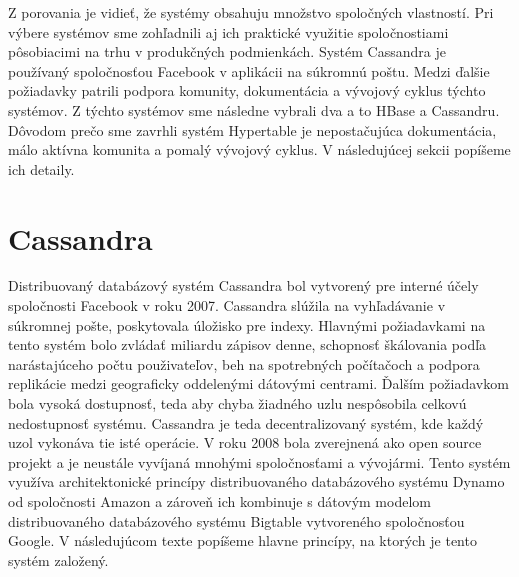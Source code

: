 \documentclass[11pt,twoside,a4paper]{book}
\begin{document}

Z porovania je vidieť, že systémy obsahuju množstvo spoločných vlastností. Pri výbere systémov sme zohľadnili aj ich praktické využitie spoločnostiami pôsobiacimi na trhu v produkčných podmienkách. Systém Cassandra je používaný spoločnosťou Facebook v aplikácii na súkromnú poštu. Medzi ďalšie požiadavky patrili podpora komunity, dokumentácia a vývojový cyklus týchto systémov. Z týchto systémov sme následne vybrali dva a to HBase a Cassandru. Dôvodom prečo sme zavrhli systém Hypertable je nepostačujúca dokumentácia, málo aktívna komunita a pomalý vývojový cyklus. V následujúcej sekcii popíšeme ich detaily.


\chapter{Cassandra}

Distribuovaný databázový systém Cassandra bol vytvorený pre interné účely spoločnosti Facebook v roku 2007. Cassandra slúžila na vyhľadávanie v súkromnej pošte, poskytovala úložisko pre indexy. Hlavnými požiadavkami na tento systém bolo zvládať miliardu zápisov denne, schopnosť škálovania podľa narástajúceho počtu použivateľov, beh na spotrebných počítačoch a podpora replikácie medzi geograficky oddelenými dátovými centrami. Ďalším požiadavkom bola vysoká dostupnosť, teda aby chyba žiadného uzlu nespôsobila celkovú nedostupnosť systému. Cassandra je teda decentralizovaný systém, kde každý uzol vykonáva tie isté operácie. V roku 2008 bola zverejnená ako open source projekt a je neustále vyvíjaná mnohými spoločnosťami a vývojármi. Tento systém využíva architektonické princípy distribuovaného databázového systému Dynamo od spoločnosti Amazon a zároveň ich kombinuje s dátovým modelom distribuovaného databázového systému Bigtable vytvoreného spoločnosťou Google. V následujúcom texte popíšeme hlavne princípy, na ktorých je tento systém založený.
\end{document}

